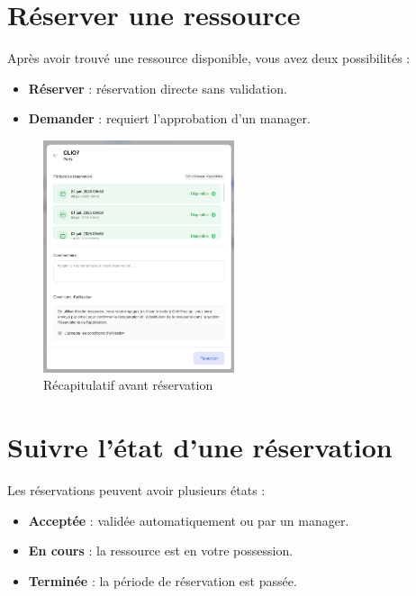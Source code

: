 \documentclass[a4paper,12pt]{article}
\begin{document}
\newpage

\section{Réserver une ressource}

Après avoir trouvé une ressource disponible, vous avez deux possibilités :

\begin{itemize}
    \item \textbf{Réserver} : réservation directe sans validation.
    \item \textbf{Demander} : requiert l’approbation d’un manager.
\end{itemize}

\begin{figure}[h!]
    \centering
    \includegraphics[width=0.5\textwidth]{UTILISATEUR/BOOK_RECAP.png}
    \caption{Récapitulatif avant réservation}
    \label{fig:book-recap}
\end{figure}

\newpage

\section{Suivre l'état d'une réservation}

Les réservations peuvent avoir plusieurs états :

\begin{itemize}
    \item \textbf{Acceptée} : validée automatiquement ou par un manager.
    \item \textbf{En cours} : la ressource est en votre possession.
    \item \textbf{Terminée} : la période de réservation est passée.
\end{itemize}
\end{document}
